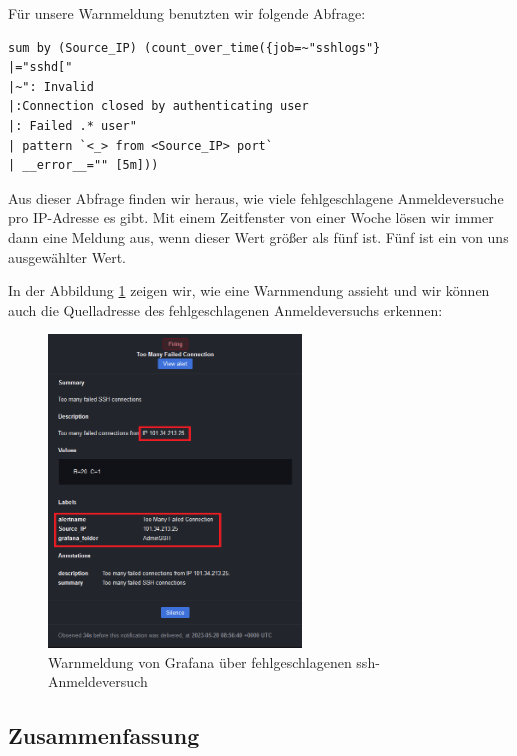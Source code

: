 Für unsere Warnmeldung benutzten wir folgende Abfrage:
\begin{center}
{
\begin{Verbatim}[frame=single]
sum by (Source_IP) (count_over_time({job=~"sshlogs"} 
|="sshd[" 
|~": Invalid
|:Connection closed by authenticating user
|: Failed .* user" 
| pattern `<_> from <Source_IP> port` 
| __error__="" [5m]))
\end{Verbatim}
}
\end{center}

Aus dieser Abfrage finden wir heraus, wie viele fehlgeschlagene Anmeldeversuche pro IP-Adresse es gibt. Mit einem Zeitfenster von einer Woche lösen wir immer dann eine Meldung aus, wenn dieser Wert größer als fünf ist. Fünf ist ein von uns ausgewählter Wert. 

\newpage
In der Abbildung \ref{fig:unsereWarnmeldung1} zeigen wir, wie eine Warnmendung assieht und wir können auch die Quelladresse des fehlgeschlagenen Anmeldeversuchs erkennen:  
\begin{figure}[H]
  \centering
  \includegraphics[width=0.6\textwidth]{assets/OurAlert.png}
  \caption[Warnmeldung von Grafana über fehlgeschlagenen \gls{ssh}-Anmeldeversuch]
  {Warnmeldung von Grafana über fehlgeschlagenen \gls{ssh}-Anmeldeversuch}
  \centering
  \label{fig:unsereWarnmeldung1}
\end{figure}

\subsection{Zusammenfassung}


